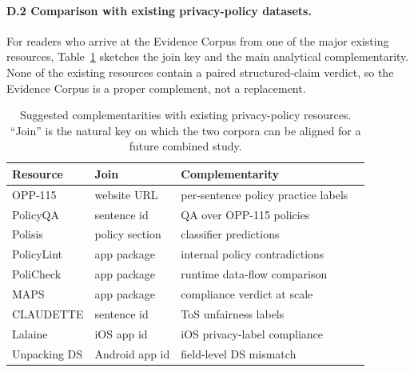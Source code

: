 \documentclass[11pt,a4paper]{article}
\begin{document}
\paragraph{D.2 Comparison with existing privacy-policy datasets.}
\label{app:compare}
For readers who arrive at the Evidence Corpus from one of the major
existing resources, Table~\ref{tab:compare} sketches the join key and
the main analytical complementarity. None of the existing resources
contain a paired structured-claim verdict, so the Evidence Corpus is a
proper complement, not a replacement.

\begin{table}[h]
\centering\small
\caption{Suggested complementarities with existing privacy-policy
resources. ``Join'' is the natural key on which the two corpora can
be aligned for a future combined study.}
\label{tab:compare}
\begin{tabular}{llll}
\toprule
Resource & Join & Complementarity \\
\midrule
OPP-115           & website URL    & per-sentence policy practice labels \\
PolicyQA          & sentence id    & QA over OPP-115 policies \\
Polisis           & policy section & classifier predictions \\
PolicyLint        & app package    & internal policy contradictions \\
PoliCheck         & app package    & runtime data-flow comparison \\
MAPS              & app package    & compliance verdict at scale \\
CLAUDETTE         & sentence id    & ToS unfairness labels \\
Lalaine           & iOS app id     & iOS privacy-label compliance \\
Unpacking DS      & Android app id & field-level DS mismatch \\
\bottomrule
\end{tabular}
\end{table}

\end{document}
